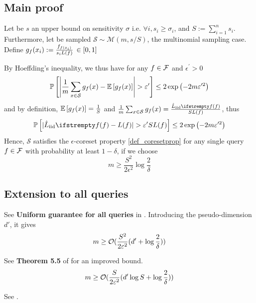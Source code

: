 \subsection{Main proof}
Let be $s$ an upper bound on sensitivity $\sigma$ i.e. $\forall i, s_i \geq \sigma_i$, and $S := \sum_{i=1}^n s_i$. Furthermore, let be sampled  $\mathcal S \sim \mathcal M(m, s/S)$, the multinomial sampling case. Define $g_f(x_i) :=  \frac{f_{f(x_i)}}{s_i L(f)}  \, \in[0,1]$

By Hoeffding's inequality, we thus have for any $f \in \mathcal{F}$ and $\epsilon^{\prime}>0$
\begin{equation}
	\mathbb{P}\left[\left|\frac{1}{m} \sum_{x \in \mathcal{S}} g_{\query}(x) - \mathbb{E}\left[g_{\query}(x)\right]\right|>\epsilon^{\prime}\right] \leq 2 \exp \left(-2 m \epsilon^{\prime 2}\right)
\end{equation}
and by definition, $\mathbb{E}\left[g_{f}(x)\right]=\frac{1}{S}$ and $\frac{1}{m} \sum_{x \in \mathcal{S}} g_{\query}(x)=\frac{\estloss{\textrm{iid}}{\query}}{S L(\query)}$, thus
\begin{equation*}
	\mathbb{P}\left[|\estloss{\textrm{iid}}{\query} - L(\query)|>\epsilon^{\prime} S L(\query)\right] \leq 2 \exp \left(-2 m \epsilon^{\prime 2}\right)
\end{equation*}
Hence, $\mathcal{S}$ satisfies the $\epsilon$-coreset property \ref{def_coresetprop} for any single query $f \in \mathcal{F}$ with probability at least $1-\delta$, if we choose
\begin{equation}
	m \geq \frac{S^{2}}{2 \epsilon^{2}} \log \frac{2}{\delta}
\end{equation}


\subsection{Extension to all queries}
See \textbf{Uniform guarantee for all queries} in \cite{bachem2017coresetML}. Introducing the pseudo-dimension $d'$, it gives
\begin{equation}
	m \geq \mathcal{O}(\frac{S^{2}}{2 \varepsilon^{2}} (d' + \log \frac{2}{\delta}))
\end{equation}

See \textbf{Theorem 5.5} of \cite{braverman2016coresetsota} for an improved bound.
\begin{equation}
	m \geq \mathcal{O}(\frac{S}{2 \varepsilon^{2}} (d' \log S + \log \frac{2}{\delta}))
\end{equation}

See \cite{bachem2017coresetML}.
